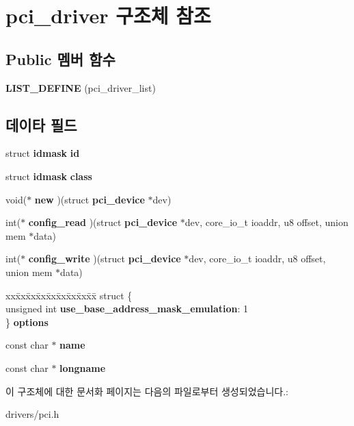 \section{pci\-\_\-driver 구조체 참조}
\label{structpci__driver}
\subsection*{Public 멤버 함수}
\begin{DoxyCompactItemize}
\item 
{\bfseries L\-I\-S\-T\-\_\-\-D\-E\-F\-I\-N\-E} (pci\-\_\-driver\-\_\-list)\label{structpci__driver_ac7eeca00f4d9cacf41d704b0d4c6ec0a}

\end{DoxyCompactItemize}
\subsection*{데이타 필드}
\begin{DoxyCompactItemize}
\item 
struct {\bf idmask} {\bfseries id}\label{structpci__driver_a0addb7b97b3a219c2aeabc19fd0d8611}

\item 
struct {\bf idmask} {\bfseries class}\label{structpci__driver_aa077fa3233fa1f4a408862a0d125874b}

\item 
void($\ast$ {\bfseries new} )(struct {\bf pci\-\_\-device} $\ast$dev)\label{structpci__driver_a6fe4275794eddb8940181ae92d70e0c2}

\item 
int($\ast$ {\bfseries config\-\_\-read} )(struct {\bf pci\-\_\-device} $\ast$dev, core\-\_\-io\-\_\-t ioaddr, u8 offset, union mem $\ast$data)\label{structpci__driver_abfe1eac4a89ba9b8f6eca06174600e5c}

\item 
int($\ast$ {\bfseries config\-\_\-write} )(struct {\bf pci\-\_\-device} $\ast$dev, core\-\_\-io\-\_\-t ioaddr, u8 offset, union mem $\ast$data)\label{structpci__driver_a19191e5182a72b52036f848734282d30}

\item 
\begin{tabbing}
xx\=xx\=xx\=xx\=xx\=xx\=xx\=xx\=xx\=\kill
struct \{\\
\>unsigned int {\bfseries use\_base\_address\_mask\_emulation}: 1\\
\} {\bfseries options}\label{structpci__driver_a94f07c8dd495863eae7ecf56496a51cf}
\\

\end{tabbing}\item 
const char $\ast$ {\bfseries name}\label{structpci__driver_a05cc3c788ae87a07ae4d92ce603ce211}

\item 
const char $\ast$ {\bfseries longname}\label{structpci__driver_a465b7186b1c03f7c2d16ec53097bfc4d}

\end{DoxyCompactItemize}


이 구조체에 대한 문서화 페이지는 다음의 파일로부터 생성되었습니다.\-:\begin{DoxyCompactItemize}
\item 
drivers/pci.\-h\end{DoxyCompactItemize}
